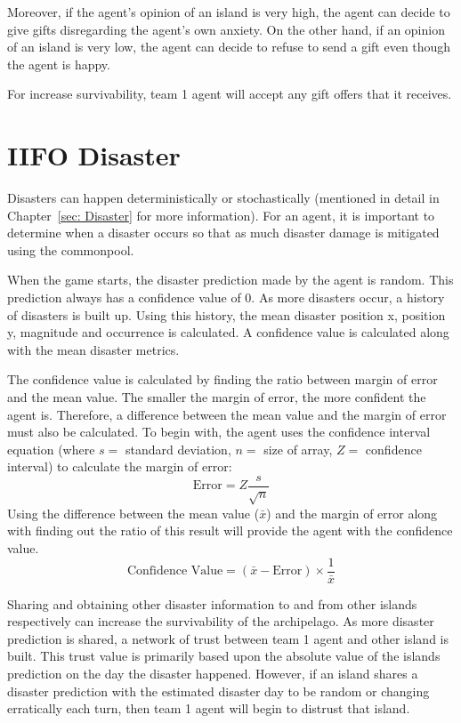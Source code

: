 Moreover, if the agent's opinion of an island is very high, the agent can decide to give gifts disregarding the agent's own anxiety. On the other hand, if an opinion of an island is very low, the agent can decide to refuse to send a gift even though the agent is happy. 

For increase survivability, team 1 agent will accept any gift offers that it receives. 

\section{IIFO Disaster}
Disasters can happen deterministically or stochastically (mentioned in detail in Chapter~\ref{sec: Disaster} for more information). For an agent, it is important to determine when a disaster occurs so that as much disaster damage is mitigated using the commonpool. 

When the game starts, the disaster prediction made by the agent is random. This prediction always has a confidence value of 0. As more disasters occur, a history of disasters is built up. Using this history, the mean disaster position x, position y, magnitude and occurrence is calculated. A confidence value is calculated along with the mean disaster metrics. 

The confidence value is calculated by finding the ratio between margin of error and the mean value. The smaller the margin of error, the more confident the agent is. Therefore, a difference between the mean value and the margin of error must also be calculated. To begin with, the agent uses the confidence interval equation (where $s =$ standard deviation, $n = $ size of array, $Z = $ confidence interval) to calculate the margin of error:
\begin{equation}
    \label{eq: Team1MarginOfError}
    \text{Error} = Z \dfrac{s}{\sqrt{n}} 
\end{equation}
Using the difference between the mean value ($\bar{x}$) and the margin of error along with finding out the ratio of this result will provide the agent with the confidence value.
\begin{equation}
    \text{Confidence Value} = (\bar{x} - \text{Error}) \times \dfrac{1}{\bar{x}}
\end{equation}

Sharing and obtaining other disaster information to and from other islands respectively can increase the survivability of the archipelago. As more disaster prediction is shared, a network of trust between team 1 agent and other island is built. This trust value is primarily based upon the absolute value of the islands prediction on the day the disaster happened. However, if an island shares a disaster prediction with the estimated disaster day to be random or changing erratically each turn, then team 1 agent will begin to distrust that island. 